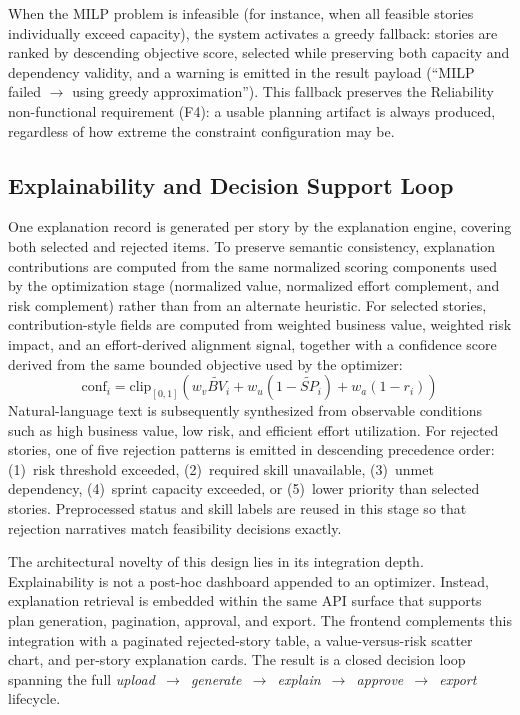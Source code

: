 \documentclass[conference]{IEEEtran}
\begin{document}
When the MILP problem is infeasible (for instance, when all feasible stories
individually exceed capacity), the system activates a greedy fallback: stories are
ranked by descending objective score, selected while preserving both capacity and
dependency validity, and a warning is emitted in the result payload
(``MILP failed $\rightarrow$ using greedy approximation'').
This fallback preserves the Reliability non-functional requirement (F4): a usable
planning artifact is always produced, regardless of how extreme the constraint
configuration may be.

\subsection{Explainability and Decision Support Loop}

One explanation record is generated per story by the explanation engine,
covering both selected and rejected items.
To preserve semantic consistency, explanation contributions are computed from the
same normalized scoring components used by the optimization stage
(normalized value, normalized effort complement, and risk complement) rather than
from an alternate heuristic.
For selected stories, contribution-style fields are computed from weighted business
value, weighted risk impact, and an effort-derived alignment signal, together with
a confidence score derived from the same bounded objective used by the optimizer:
\begin{equation}
	\text{conf}_i =
	\text{clip}_{[0,1]}\!\left(
	w_v \widetilde{BV}_i + w_u(1-\widetilde{SP}_i) + w_a(1-r_i)
	\right)
	\label{eq:confidence}
\end{equation}
Natural-language text is subsequently synthesized from observable conditions such
as high business value, low risk, and efficient effort utilization.
For rejected stories, one of five rejection patterns is emitted in descending
precedence order: (1)~risk threshold exceeded, (2)~required skill unavailable,
(3)~unmet dependency, (4)~sprint capacity exceeded, or (5)~lower priority than
selected stories. Preprocessed status and skill labels are reused in this stage so
that rejection narratives match feasibility decisions exactly.

The architectural novelty of this design lies in its integration depth.
Explainability is not a post-hoc dashboard appended to an optimizer.
Instead, explanation retrieval is embedded within the same API surface that supports
plan generation, pagination, approval, and export.
The frontend complements this integration with a paginated rejected-story table, a
value-versus-risk scatter chart, and per-story explanation cards.
The result is a closed decision loop spanning the full
\emph{upload~$\to$~generate~$\to$~explain~$\to$~approve~$\to$~export} lifecycle.
\end{document}
